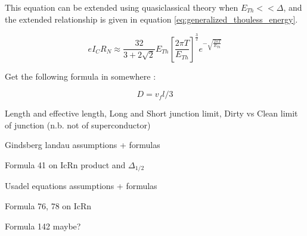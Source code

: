 This equation can be extended using quasiclassical theory when $E_{Th} << \Delta$, and the extended relationship is given in equation \ref{eq:generalized_thouless_energy}.

\begin{equation}
\label{eq:generalized_thouless_energy}
eI_CR_N \approx \frac{32}{3+2\sqrt{2}} E_{Th} \left[ \frac{2\pi T}{E_{Th}} \right]^{\frac{3}{2}}e^{-\sqrt{\frac{2\pi T}{E_{Th}}}}
\end{equation}


Get the following formula in somewhere :

$$
D = v_f l/3
$$


Length and effective length, Long and Short junction limit, Dirty vs Clean limit of junction (n.b. not of superconductor)


Gindsberg landau assumptions + formulas

Formula 41 on IcRn product and $\Delta_{1/2}$

Usadel equations assumptions + formulas

Formula 76, 78 on IcRn

Formula 142 maybe?

\fi




